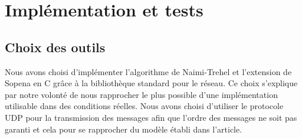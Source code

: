 
\chapter{Implémentation et tests}\label{implementation}

\section{Choix des outils}
Nous avons choisi d'implémenter l'algorithme de Naimi-Trehel et l'extension de Sopena en C grâce à la bibliothèque standard pour le réseau. Ce choix s'explique par notre volonté de nous rapprocher le plus possible d'une implémentation utilisable dans des conditions réelles. Nous avons choisi d'utiliser le protocole UDP pour la transmission des messages afin que l'ordre des messages ne soit pas garanti et cela pour se rapprocher du modèle établi dans l'article.




